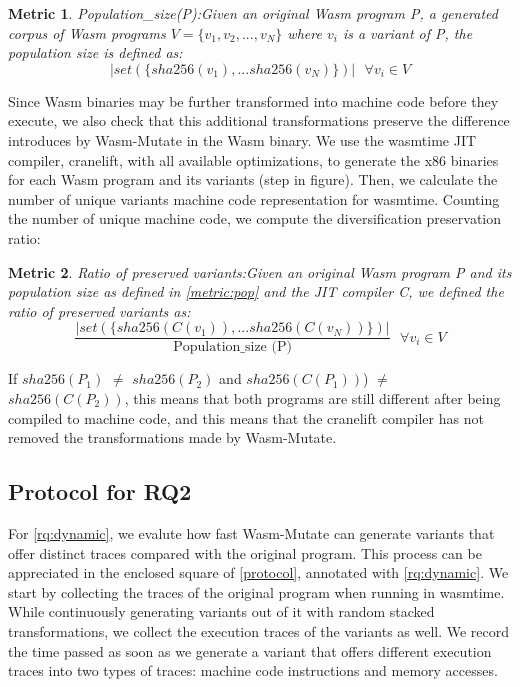 \documentclass[sigplan,screen]{acmart}
\newcommand{\tool}{{\sc Wasm-Mutate}\xspace}
\newcommand{\wasm}{Wasm\xspace}
\newtheorem{metric}{Metric}
\newcommand*\step[1]{
\noindent\tikz[baseline=(char.base)]{
        \node[shape=circle,text=black,draw=black, fill=white,inner sep=1.2pt] (char) {#1};}}
\begin{document}
\begin{metric}{Population\_size(P):}\label{metric:pop}
Given an original \wasm program P, a generated corpus of \wasm programs $V=\{v_1, v_2, ..., v_N\}$ where $v_i$ is a variant of P, the population size is defined as:
$$
    | set(\{ sha256(v_1), ... sha256(v_N) \})|\text{ }\forall v_i \in V 
$$
\end{metric}


Since \wasm binaries may be further transformed into machine code before they execute, we also check that this additional transformations preserve the difference introduces by \tool in the \wasm binary. 
We use the wasmtime JIT compiler, cranelift, with all available optimizations, to generate the x86 binaries for each \wasm program and its variants  (step \step{3} in figure). 
Then, we calculate the number of unique variants machine code representation for wasmtime.
Counting the number of unique machine code, we compute the diversification preservation ratio: \\

\begin{metric}{Ratio of preserved variants:}\label{metric:preservation}
    Given an original \wasm program P and its population size as defined in \autoref{metric:pop} and the JIT compiler C, we defined the ratio of preserved variants as:
    $$
        \frac{ | set(\{ sha256(C(v_1)), ... sha256(C(v_N)) \})|}{ \text{Population\_size (P)}} \text{ }\forall v_i \in V 
    $$

    
\end{metric}

If  $sha256(P_1)$ $\neq$ $sha256(P_2)$ and $sha256(C(P_1))$) $\neq$ $sha256(C(P_2))$, this means that  both programs are still different after being compiled to machine code, and this means that the cranelift compiler has not removed the transformations made by \tool.  

\subsection{Protocol for RQ2}
\newcommand{\samples}{100\xspace}

For \ref{rq:dynamic}, we evalute how fast \tool can generate variants that offer distinct traces compared with the original program.
This process can be appreciated in the enclosed square of \autoref{protocol}, annotated with \ref{rq:dynamic}.
We start by collecting the traces of the original program when running in wasmtime.
While continuously generating variants out of it with random stacked transformations, we collect the execution traces of the variants as well.
We record the time passed as soon as we generate a variant that offers different execution traces into two types of traces: machine code instructions and memory accesses.
\end{document}
